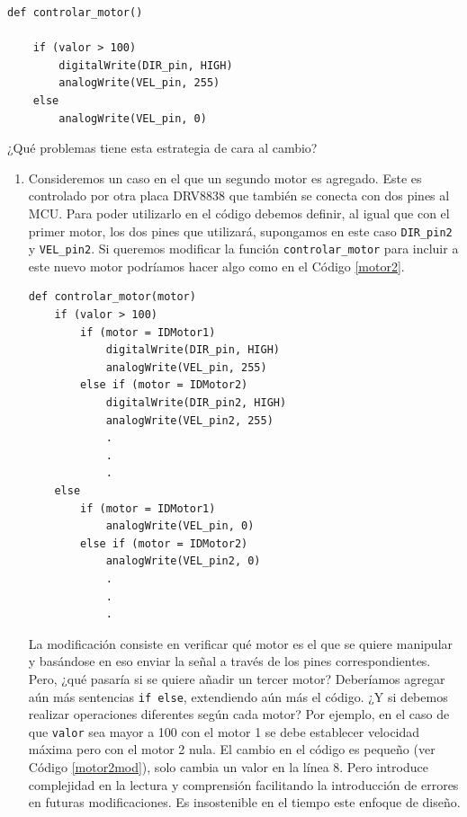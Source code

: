 \begin{lstlisting}[caption=Ejemplo uso del motor DC.,label={listingMotor}]
def controlar_motor()

	if (valor > 100)
    	digitalWrite(DIR_pin, HIGH)
	    analogWrite(VEL_pin, 255)
	else
	    analogWrite(VEL_pin, 0)

\end{lstlisting}

¿Qué problemas tiene esta estrategia de cara al cambio?
\begin{enumerate}
	\item Consideremos un caso en el que un segundo motor es agregado. Este es controlado por otra placa \gls{DRV8838} que también se conecta con dos pines al \gls{MCU}. Para poder utilizarlo en el código debemos definir, al igual que con el primer motor, los dos pines que utilizará, supongamos en este caso \verb|DIR_pin2| y \verb|VEL_pin2|. Si queremos modificar la función \verb|controlar_motor| para incluir a este nuevo motor podríamos hacer algo como en el Código \ref{motor2}.
	
\begin{lstlisting}[caption=Extensión de la función controlar\_motor para controlar dos motores.,label={motor2}]
def controlar_motor(motor)
    if (valor > 100)
        if (motor = IDMotor1)
            digitalWrite(DIR_pin, HIGH)
            analogWrite(VEL_pin, 255)
        else if (motor = IDMotor2)
            digitalWrite(DIR_pin2, HIGH)
            analogWrite(VEL_pin2, 255)
	        .
	        .
	        .
    else
        if (motor = IDMotor1)
            analogWrite(VEL_pin, 0)
        else if (motor = IDMotor2)
            analogWrite(VEL_pin2, 0)
	    	.
	    	.
	    	.

\end{lstlisting}
	
La modificación consiste en verificar qué motor es el que se quiere manipular y basándose en eso enviar la señal a través de los pines correspondientes. Pero, ¿qué pasaría si se quiere añadir un tercer motor? Deberíamos agregar aún más sentencias \verb|if else|, extendiendo aún más el código. ¿Y si debemos realizar operaciones diferentes según cada motor? Por ejemplo, en el caso de que \verb|valor| sea mayor a 100 con el motor 1 se debe establecer velocidad máxima pero con el motor 2 nula. El cambio en el código es pequeño (ver Código \ref{motor2mod}), solo cambia un valor en la línea 8. Pero introduce complejidad en la lectura y comprensión facilitando la introducción de errores en futuras modificaciones. Es insostenible en el tiempo este enfoque de diseño.


\end{enumerate}

